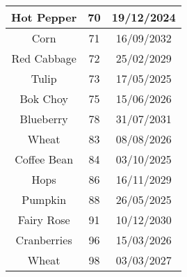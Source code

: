 \documentclass{article}
\begin{document}
\begin{tabular}{|c|c|c|}
\hline
Hot Pepper & 70 & 19/12/2024 \\
\hline
Corn & 71 & 16/09/2032 \\
\hline
Red Cabbage & 72 & 25/02/2029 \\
\hline
Tulip & 73 & 17/05/2025 \\
\hline
Bok Choy & 75 & 15/06/2026 \\
\hline
Blueberry & 78 & 31/07/2031 \\
\hline
Wheat & 83 & 08/08/2026 \\
\hline
Coffee Bean & 84 & 03/10/2025 \\
\hline
Hops & 86 & 16/11/2029 \\
\hline
Pumpkin & 88 & 26/05/2025 \\
\hline
Fairy Rose & 91 & 10/12/2030 \\
\hline
Cranberries & 96 & 15/03/2026 \\
\hline
Wheat & 98 & 03/03/2027 \\
\hline
\end{tabular}
\end{document}
